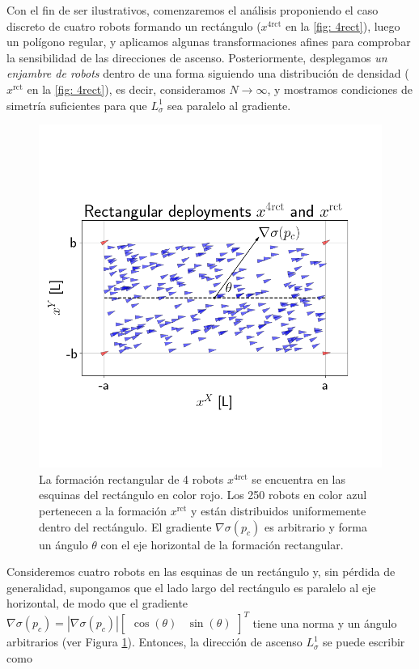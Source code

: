Con el fin de ser ilustrativos, comenzaremos el análisis proponiendo el caso discreto de cuatro robots formando un rectángulo ($x^{\text{4rct}}$ en la \autoref{fig: 4rect}), luego un polígono regular, y aplicamos algunas transformaciones afines para comprobar la sensibilidad de las direcciones de ascenso. Posteriormente, desplegamos \emph{un enjambre de robots} dentro de una forma siguiendo una distribución de densidad ($x^{\text{rct}}$ en la \autoref{fig: 4rect}), es decir, consideramos $N\to\infty$, y mostramos condiciones de simetría suficientes para que $L^1_{\sigma}$ sea paralelo al gradiente.

\vspace{0.4cm}

\begin{figure}[!h]
\centering
\includegraphics[trim={0 3.4cm 0 5.67cm}, clip, width=0.8\columnwidth]{./fig/4rect.png}
\caption{La formación rectangular de 4 robots $x^\text{4rct}$ se encuentra en las esquinas del rectángulo en color rojo. Los 250 robots en color azul pertenecen a la formación $x^\text{rct}$ y están distribuidos uniformemente dentro del rectángulo. El gradiente $\nabla\sigma(p_c)$ es arbitrario y forma un ángulo $\theta$ con el eje horizontal de la formación rectangular.}
\label{fig: 4rect}
\end{figure}

\newpage

Consideremos cuatro robots en las esquinas de un rectángulo y, sin pérdida de generalidad, supongamos que el lado largo del rectángulo es paralelo al eje horizontal, de modo que el gradiente $\nabla\sigma(p_c) = |\nabla\sigma(p_c)| \left[\begin{smallmatrix}\cos(\theta) & \sin(\theta) \end{smallmatrix}\right]^T$ tiene una norma y un ángulo arbitrarios (ver Figura \ref{fig: 4rect}). Entonces, la dirección de ascenso $L^1_{\sigma}$ se puede escribir como


